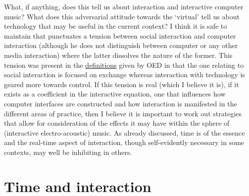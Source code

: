 \label{sec:human-comp-inter:par6}
What, if anything, does this tell us about interaction and interactive computer music? What does this adversarial attitude towards the `virtual' tell us about technology that may be useful in the current context? I think it is safe to maintain that \citeauthor{baudrillard02} punctuates a tension between social interaction and computer interaction (although he does not distinguish between computer or any other media interaction) where the latter dissolves the nature of the former. This tension was present in the \hyperref[sec:inter-defin]{definitions} given by OED in that the one relating to social interaction is focused on exchange whereas interaction with technology is geared more towards control. If this tension is real (which I believe it is), if it exists as a coefficient in the interactive equation, one that influences how computer interfaces are constructed and how interaction is manifested in the different areas of practice, then I believe it is important to work out strategies that allow for consideration of the effects it may have within the sphere of (interactive electro-acoustic) music. As already discussed, time is of the essence and the real-time aspect of interaction, though self-evidently necessary in some contexts, may well be inhibiting in others.

\section{Time and interaction}
\label{sec:time-interaction}

